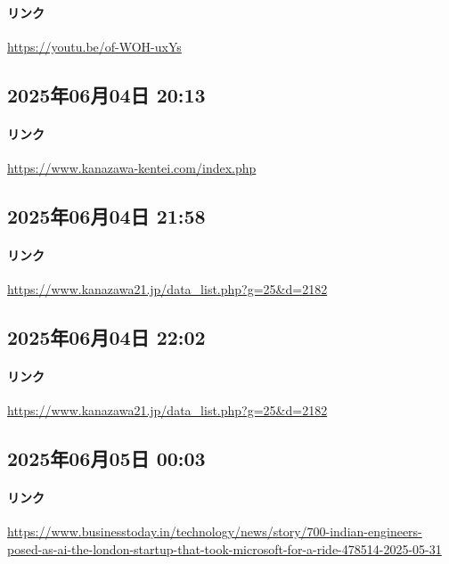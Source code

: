 \paragraph{リンク}
\url{https://youtu.be/of-WOH-uxYs}

\subsection*{2025年06月04日 20:13}

\paragraph{リンク}
\url{https://www.kanazawa-kentei.com/index.php}

\subsection*{2025年06月04日 21:58}

\paragraph{リンク}
\url{https://www.kanazawa21.jp/data_list.php?g=25&d=2182}

\subsection*{2025年06月04日 22:02}

\paragraph{リンク}
\url{https://www.kanazawa21.jp/data_list.php?g=25&d=2182}

\subsection*{2025年06月05日 00:03}

\paragraph{リンク}
\url{https://www.businesstoday.in/technology/news/story/700-indian-engineers-posed-as-ai-the-london-startup-that-took-microsoft-for-a-ride-478514-2025-05-31}

